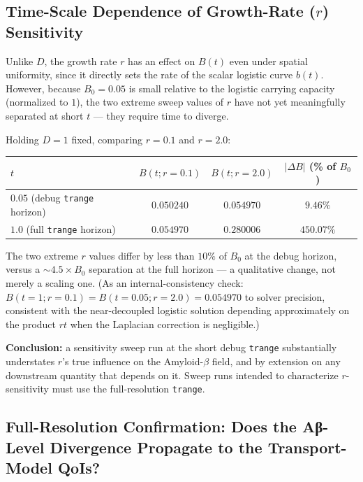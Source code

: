 \subsection{Time-Scale Dependence of Growth-Rate (\texorpdfstring{$r$}{r}) Sensitivity}
\label{sec:abeta-r-timescale}

Unlike $D$, the growth rate $r$ has an effect on $B(t)$ even under spatial uniformity, since it directly sets the rate of the scalar logistic curve $b(t)$. However, because $B_0 = 0.05$ is small relative to the logistic carrying capacity (normalized to $1$), the two extreme sweep values of $r$ have not yet meaningfully separated at short $t$ --- they require time to diverge.

Holding $D = 1$ fixed, comparing $r = 0.1$ and $r = 2.0$:

\begin{center}
\begin{tabular}{lccc}
\hline
$t$ & $B(t; r{=}0.1)$ & $B(t; r{=}2.0)$ & $|\Delta B|$ (\% of $B_0$) \\
\hline
$0.05$ (debug \texttt{trange} horizon) & $0.050240$ & $0.054970$ & $9.46\%$ \\
$1.0$ (full \texttt{trange} horizon)   & $0.054970$ & $0.280006$ & $450.07\%$ \\
\hline
\end{tabular}
\end{center}

The two extreme $r$ values differ by less than $10\%$ of $B_0$ at the debug horizon, versus a $\sim 4.5\times B_0$ separation at the full horizon --- a qualitative change, not merely a scaling one. (As an internal-consistency check: $B(t{=}1; r{=}0.1) = B(t{=}0.05; r{=}2.0) = 0.054970$ to solver precision, consistent with the near-decoupled logistic solution depending approximately on the product $rt$ when the Laplacian correction is negligible.)

\textbf{Conclusion:} a sensitivity sweep run at the short debug \texttt{trange} substantially understates $r$'s true influence on the Amyloid-$\beta$ field, and by extension on any downstream quantity that depends on it. Sweep runs intended to characterize $r$-sensitivity must use the full-resolution \texttt{trange}.

\subsection{Full-Resolution Confirmation: Does the Aβ-Level Divergence Propagate to the Transport-Model QoIs?}
\label{sec:kappa-fullres}

